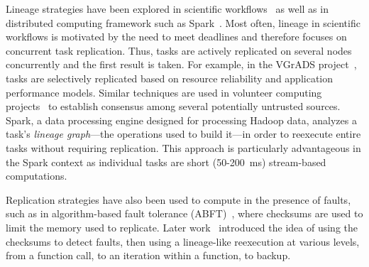 \documentclass{sig-alternate}
\begin{document}
Lineage strategies have been explored in scientific workflows~\cite{ramakrishnan09vgrads, calheiros13deadlines, Chimera2002} as well as in distributed computing framework such as Spark~\cite{RDD2012}. Most often, lineage in scientific workflows is motivated by the need to meet deadlines and therefore focuses on concurrent task replication. Thus, tasks are actively replicated on several nodes concurrently and the first result is taken. For example, in the VGrADS project~\cite{ramakrishnan09vgrads}, tasks are selectively replicated based on resource reliability and application performance models. Similar techniques are used in volunteer computing projects~\cite{boinc04} to establish consensus among several potentially untrusted sources. Spark, a data processing engine designed for processing Hadoop data, analyzes a task's \emph{lineage graph}---the operations used to build it---in order to reexecute entire tasks without requiring replication. This approach is particularly advantageous in the Spark context as individual tasks are short (50-200~ms) stream-based computations.

Replication strategies have also been used to compute in the presence of faults, such as in algorithm-based fault tolerance (ABFT)~\cite{abft}, where checksums are used to limit the memory used to replicate.  Later work~\cite{turmon1, turmon2, gunnels} introduced the idea of using the checksums to detect faults, then using a lineage-like reexecution at various levels, from a function call, to an iteration within a function, to backup.
\end{document}
